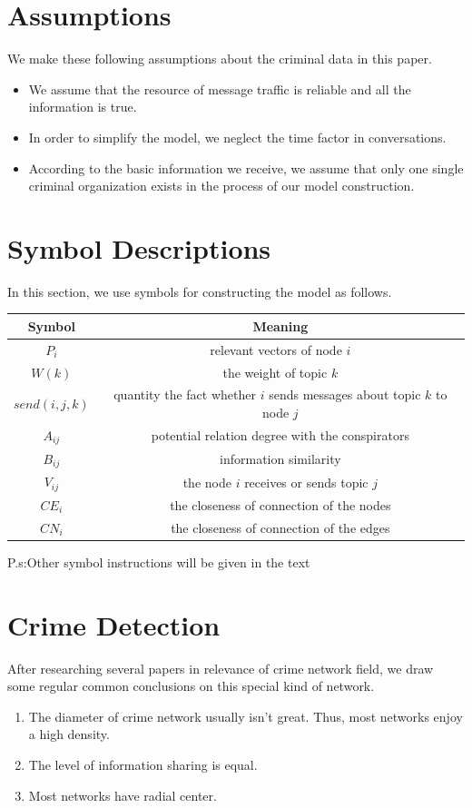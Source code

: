 \documentclass[12pt]{article}
\begin{document}
\section{Assumptions} 
	We make these following assumptions about the criminal data in this paper.
\begin{itemize}
\item We assume that the resource of message traffic is reliable and all the information is true.
\item In order to simplify the model, we neglect the time factor in conversations.
\item According to the basic information we receive, we assume that only one single  criminal organization exists in the process of our model construction.
\end{itemize}

\section{Symbol Descriptions}

In this section, we use symbols  for constructing the model as follows.


\begin{table}[!htb]
\centering
{}
\begin{tabular}{c|c}
\toprule[2pt] 
\textbf{Symbol} & \textbf{Meaning} \\
\hline
$P_i$ & relevant vectors of node $i$ \\
$W(k)$ & the weight of topic $k$ \\
$send(i,j,k)$ & quantity the fact whether $i$ sends messages about topic $k$ to node $j$ \\
$A_{ij}$ & potential relation degree  with the conspirators \\
$B_{ij}$ & information similarity \\
$V_{ij}$ & the node $i$ receives or sends topic $j$ \\
$CE_i$ & the closeness of connection of the nodes \\
$CN_i$ & the closeness of connection of the edges \\
\hline
\end{tabular}
\end{table}
\begin{flushright}
P.s:Other symbol instructions will be given in the text
\end{flushright}



\section{Crime Detection}
	After researching several papers in relevance of crime network field, we draw some regular common conclusions on this special kind of network.
\begin{enumerate}
\item The diameter of crime network usually isn’t great. Thus, most networks enjoy a high density.
\item The level of information sharing is equal.
\item Most networks have radial center.
\end{enumerate}
	
\end{document}
